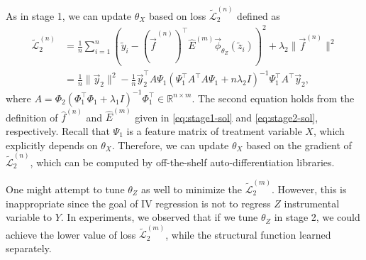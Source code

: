 As in stage 1, we can update $\theta_X$ based on loss $\tilde{\mathcal{L}}^{(n)}_2$ defined as
\begin{align*}
    \tilde{\mathcal{L}}^{(n)}_2 &= \frac1n \sum_{i=1}^n (\tilde y_i -(\hat{\vec{f}}^{(n)})^\top \hat{E}^{(m)} \vec{\phi}_{\theta_Z}(\tilde z_i))^2 + \lambda_2 \|\vec{f}^{(n)}\|^2\\
    &= \frac1n \|\vec{y}_2\|^2 - \frac1n \vec{y}_2^\top A \Psi_1(\Psi^\top_1 A^\top A \Psi_1 + n\lambda_2 I)^{-1} \Psi_1^\top A^\top \vec{y}_2,
\end{align*}
where $A = \Phi_2(\Phi_1^\top \Phi_1 + \lambda_1I)^{-1}\Phi_1^\top \in \mathbb{R}^{n\times m}$. The second equation holds from the definition of $\hat{f}^{(n)}$ and $\hat{E}^{(m)}$ given in \eqref{eq:stage1-sol} and \eqref{eq:stage2-sol}, respectively. Recall that $\Psi_1$ is a feature matrix of treatment variable $X$, which explicitly depends on $\theta_X$. Therefore, we can update $\theta_X$ based on the gradient of $\tilde{\mathcal{L}}_2^{(n)}$, which can be computed by off-the-shelf auto-differentiation libraries.
 
One might attempt to tune $\theta_Z$ as well to minimize the $\tilde{\mathcal{L}}_2^{(m)}$. However, this is inappropriate since the goal of IV regression is not to regress $Z$ instrumental variable to $Y$. In experiments, we observed that if we tune $\theta_Z$ in stage 2, we could achieve the lower value of loss $\tilde{\mathcal{L}}^{(m)}_2$, while the structural function learned separately.
